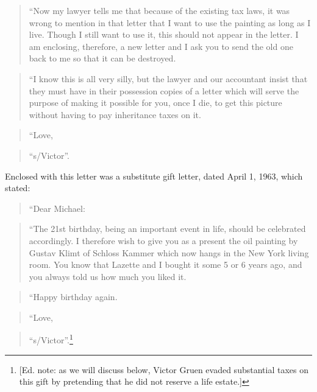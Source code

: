 \begin{quote}
{}``Now my lawyer tells me that because of the existing tax laws, it was wrong
to mention in that letter that I want to use the painting as long as I live.
Though I still want to use it, this should not appear in the letter. I am
enclosing, therefore, a new letter and I ask you to send the old one back to me
so that it can be destroyed.
\end{quote}

\begin{quote}
{}``I know this is all very silly, but the lawyer and our accountant insist that
they must have in their possession copies of a letter which will serve the
purpose of making it possible for you, once I die, to get this picture without
having to pay inheritance taxes on it.
\end{quote}

\begin{quote}
{}``Love,
\end{quote}

\begin{quote}
{}``s/Victor''.
\end{quote}

Enclosed with this letter was a substitute gift letter, dated April 1, 1963,
which stated:

\begin{quote}
{}``Dear Michael:
\end{quote}

\begin{quote}
{}``The 21st birthday, being an important event in life, should be celebrated
accordingly. I therefore wish to give you as a present the oil painting by
Gustav Klimt of Schloss Kammer which now hangs in the New York living room. You
know that Lazette and I bought it some 5 or 6 years ago, and you always told us
how much you liked it.
\end{quote}

\begin{quote}
{}``Happy birthday again.
\end{quote}

\begin{quote}
{}``Love,
\end{quote}

\begin{quote}
{}``s/Victor''.\footnote{ [Ed. note: as we will discuss below, Victor Gruen
evaded substantial taxes on this gift by pretending that he did not reserve a
life estate.]}
\end{quote}

